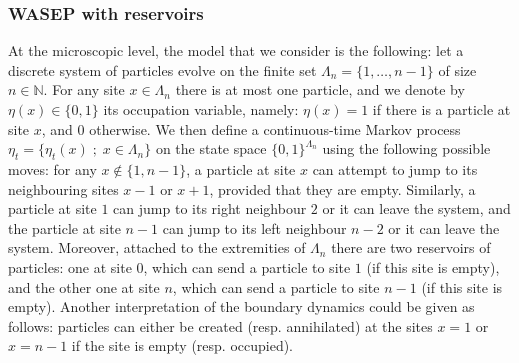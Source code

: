 \documentclass[10pt]{amsart}
\theoremstyle{definition}\newtheorem{defi}[theo]{Definition}\newtheorem{rema}[theo]{Remark}\newtheorem{exam}[theo]{Example}\newtheorem{exem}[theo]{Example}\newtheorem{nota}[theo]{Notation}
\newcommand{\bb}[1]{{\mathbb #1}}
\begin{document}
\subsubsection{WASEP with reservoirs} At the microscopic level, the model that we consider is the following: let a discrete system of particles evolve on the finite set $\Lambda_n=\{1,\dots,n-1\}$ of size $n\in\bb N$. For any site $x\in\Lambda_n$ there is at most one particle, and we denote by $\eta(x)\in\{0,1\}$ its occupation variable, namely: $\eta(x)=1$ if there is a particle at site $x$, and 0 otherwise. We then define a continuous-time Markov process $\eta_t=\{\eta_t(x)\; ; \; x\in\Lambda_n\}$ on the state space $\{0,1\}^{\Lambda_n}$ using the following possible moves: for any $x \notin\{1,n-1\}$, a particle at site $x$ can attempt to jump to its neighbouring sites $x-1$ or $x+1$, provided that they are empty. Similarly, a particle at site $1$ can jump to its right neighbour $2$ or it can leave the system, and the particle at site $n-1$ can jump to its left neighbour $n-2$ or it can leave the system. Moreover, attached to the extremities of $\Lambda_n$ there are two reservoirs of particles: one at site $0$, which can send a particle to site $1$ (if this site is empty), and the other one at site $n$, which can send a particle to site $n-1$ (if this site is empty). Another interpretation of the boundary dynamics could be given as follows: particles can either be created (resp. annihilated) at the sites $x=1$ or $x=n-1$ if the site is empty (resp. occupied).
\end{document}
